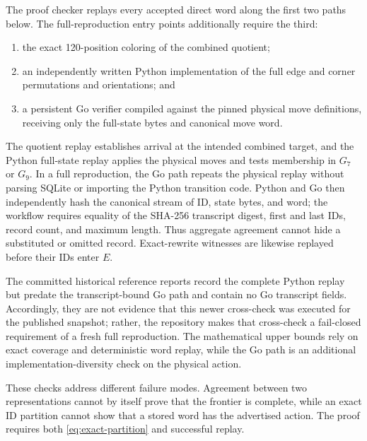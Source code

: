 The proof checker replays every accepted direct word along the first two paths
below.  The full-reproduction entry points additionally require the third:
\begin{enumerate}
  \item the exact 120-position coloring of the combined quotient;
  \item an independently written Python implementation of the full edge and
    corner permutations and orientations; and
  \item a persistent Go verifier compiled against the pinned physical move
    definitions, receiving only the full-state bytes and canonical move word.
\end{enumerate}
The quotient replay establishes arrival at the intended combined target, and
the Python full-state replay applies the physical moves and tests membership in
$G_7$ or $G_9$.  In a full reproduction, the Go path repeats the physical
replay without parsing SQLite or importing the Python transition code.  Python
and Go then independently hash the canonical stream of ID, state bytes, and
word; the workflow requires equality of the SHA-256 transcript digest, first
and last IDs, record count, and maximum length.  Thus aggregate agreement
cannot hide a substituted or omitted record.  Exact-rewrite witnesses are
likewise replayed before their IDs enter $E$.

The committed historical reference reports record the complete Python replay
but predate the transcript-bound Go path and contain no Go transcript fields.
Accordingly, they are not evidence that this newer cross-check was executed for
the published snapshot; rather, the repository makes that cross-check a
fail-closed requirement of a fresh full reproduction.  The mathematical upper
bounds rely on exact coverage and deterministic word replay, while the Go path
is an additional implementation-diversity check on the physical action.

These checks address different failure modes.  Agreement between two
representations cannot by itself prove that the frontier is complete, while an
exact ID partition cannot show that a stored word has the advertised action.
The proof requires both \cref{eq:exact-partition} and successful replay.

